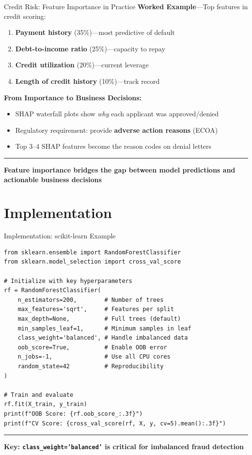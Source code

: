 \documentclass[8pt,aspectratio=169]{beamer}
\newcommand{\bottomnote}[1]{%
\vfill
\vspace{-2mm}
\textcolor{mllavender2}{\rule{\textwidth}{0.4pt}}
\vspace{1mm}
\footnotesize
\textbf{#1}
}
\begin{document}
\begin{frame}[t]{Credit Risk: Feature Importance in Practice}
\textbf{Worked Example}---Top features in credit scoring:
\begin{enumerate}
\item \textbf{Payment history} (35\%)---most predictive of default
\item \textbf{Debt-to-income ratio} (25\%)---capacity to repay
\item \textbf{Credit utilization} (20\%)---current leverage
\item \textbf{Length of credit history} (10\%)---track record
\end{enumerate}

\vspace{0.3em}
\textbf{From Importance to Business Decisions:}
\begin{itemize}
\item SHAP waterfall plots show \textit{why} each applicant was approved/denied
\item Regulatory requirement: provide \textbf{adverse action reasons} (ECOA)
\item Top 3--4 SHAP features become the reason codes on denial letters
\end{itemize}
\bottomnote{Feature importance bridges the gap between model predictions and actionable business decisions}
\end{frame}

\section{Implementation}

\begin{frame}[t,fragile]{Implementation: scikit-learn Example}
\small
\begin{verbatim}
from sklearn.ensemble import RandomForestClassifier
from sklearn.model_selection import cross_val_score

# Initialize with key hyperparameters
rf = RandomForestClassifier(
    n_estimators=200,        # Number of trees
    max_features='sqrt',     # Features per split
    max_depth=None,          # Full trees (default)
    min_samples_leaf=1,      # Minimum samples in leaf
    class_weight='balanced', # Handle imbalanced data
    oob_score=True,          # Enable OOB error
    n_jobs=-1,               # Use all CPU cores
    random_state=42          # Reproducibility
)

# Train and evaluate
rf.fit(X_train, y_train)
print(f"OOB Score: {rf.oob_score_:.3f}")
print(f"CV Score: {cross_val_score(rf, X, y, cv=5).mean():.3f}")
\end{verbatim}
\bottomnote{Key: \texttt{class\_weight='balanced'} is critical for imbalanced fraud detection}
\end{frame}
\end{document}
